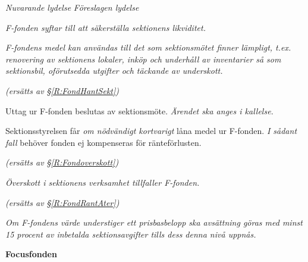 \documentclass{article}
\newenvironment{lydelse}
    {\begin{paracol}{2}%
        \emph{Nuvarande lydelse}%
        \switchcolumn%
        \emph{Föreslagen lydelse}%
    \end{paracol}%
    \begin{enumerate}[label=\thesubsection.\arabic*]%
    \begin{paracol}{2}%
    }{\end{paracol}\end{enumerate}}
\begin{document}
\begin{lydelse}
    \setcounter{subsection}{3}
    \switchcolumn
    \setcounter{enumi}{3}
    
    \item \emph{F-fonden syftar till att säkerställa sektionens likviditet.}
    
    \item \emph{ F-fondens medel kan användas till det som sektionsmötet finner lämpligt, t.ex. renovering av sektionens lokaler, inköp och underhåll av inventarier så som sektionsbil, oförutsedda utgifter och täckande av underskott.}
    
    
    
    \vspace{7.3em}
    \item[]
    \item[] \emph{(ersätts av \S\ref{R:FondHantSekt})}
    
    \item Uttag ur F-fonden beslutas av sektionsmöte. \emph{Ärendet ska anges i kallelse.}
    
    \vspace{3ex}
    \item Sektionsstyrelsen får \emph{om nödvändigt kortvarigt} låna medel ur F-fonden.\emph{ I sådant fall} behöver fonden ej kompenseras för ränteförlusten.
    
    \item[] \emph{(ersätts av \S\ref{R:Fondoverskott})}
    
    \vspace{1.2em}
    \item \emph{Överskott i sektionens verksamhet tillfaller F-fonden.}
    \label{R:Fondoverskott}
    
    \vspace{8.5ex}
    \item[] \emph{(ersätts av \S\ref{R:FondRantAter})}
    
    \vspace{2.75ex}
    \item \emph{Om F-fondens värde understiger ett prisbasbelopp ska avsättning göras med minst 15 procent av inbetalda sektionsavgifter tills dess denna nivå uppnås.}
\end{lydelse}
\textbf{Focusfonden}
\end{document}
